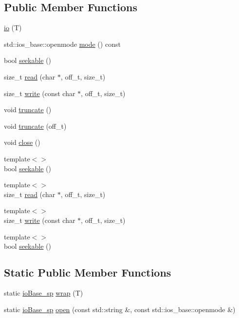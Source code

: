 \subsection*{Public Member Functions}
\begin{DoxyCompactItemize}
\item 
\mbox{\hyperlink{classebml_1_1io_acf15f9f08eb2e65c72363320aa8bc112}{io}} (T)
\item 
std\+::ios\+\_\+base\+::openmode \mbox{\hyperlink{classebml_1_1io_ab1143b5c835958387d95695151744d33}{mode}} () const
\item 
bool \mbox{\hyperlink{classebml_1_1io_ab019a4128b3339941124a12632c919fd}{seekable}} ()
\item 
size\+\_\+t \mbox{\hyperlink{classebml_1_1io_ad745dc2c29544750dcd38a21cba0a16c}{read}} (char $\ast$, off\+\_\+t, size\+\_\+t)
\item 
size\+\_\+t \mbox{\hyperlink{classebml_1_1io_a5c3f2df6edfbd090b4d0fbc8a6dacccb}{write}} (const char $\ast$, off\+\_\+t, size\+\_\+t)
\item 
void \mbox{\hyperlink{classebml_1_1io_a6a5c0f2182844094c6b4432a15adccc8}{truncate}} ()
\item 
void \mbox{\hyperlink{classebml_1_1io_a9a50a99136e7e9a4a404dc3087024a7f}{truncate}} (off\+\_\+t)
\item 
void \mbox{\hyperlink{classebml_1_1io_a929714d05587d37d46bf8813b35c788d}{close}} ()
\item 
{\footnotesize template$<$$>$ }\\bool \mbox{\hyperlink{classebml_1_1io_a6e97c1e6868bf65286328b9447eaa419}{seekable}} ()
\item 
{\footnotesize template$<$$>$ }\\size\+\_\+t \mbox{\hyperlink{classebml_1_1io_a3b291aa8fb7bbeeb3f9d2ef152c37115}{read}} (char $\ast$, off\+\_\+t, size\+\_\+t)
\item 
{\footnotesize template$<$$>$ }\\size\+\_\+t \mbox{\hyperlink{classebml_1_1io_aedbdf5a69ee0ae64f909a59645cd0db7}{write}} (const char $\ast$, off\+\_\+t, size\+\_\+t)
\item 
{\footnotesize template$<$$>$ }\\bool \mbox{\hyperlink{classebml_1_1io_a4ea6caf18c5646646b3a15bc3c59a5ab}{seekable}} ()
\end{DoxyCompactItemize}
\subsection*{Static Public Member Functions}
\begin{DoxyCompactItemize}
\item 
static \mbox{\hyperlink{namespaceebml_a7bb59128ac6af27e47367938a846b569}{io\+Base\+\_\+sp}} \mbox{\hyperlink{classebml_1_1io_a722fbb02777e4af8e42779750c588f63}{wrap}} (T)
\item 
static \mbox{\hyperlink{namespaceebml_a7bb59128ac6af27e47367938a846b569}{io\+Base\+\_\+sp}} \mbox{\hyperlink{classebml_1_1io_a98871b6a6ceafc80df00f95867b7cbe4}{open}} (const std\+::string \&, const std\+::ios\+\_\+base\+::openmode \&)
\end{DoxyCompactItemize}
